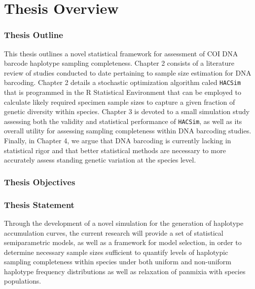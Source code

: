 \linespread{1.0}

\chapter{Thesis Overview}
\subsection{Thesis Outline} \label{sec:intro1}

This thesis outlines a novel statistical framework for assessment of COI DNA barcode haplotype sampling completeness. Chapter 2 consists of a literature review of studies conducted to date pertaining to sample size estimation for DNA barcoding. Chapter 2 details a stochastic optimization algorithm caled {\tt HACSim} that is programmed in the R Statistical Environment that can be employed to calculate likely required specimen sample sizes to capture a given fraction of genetic diversity within species. Chapter 3 is devoted to a small simulation study assessing both the validity and statistical performance of {\tt HACSim}, as well as its overall utility for assessing sampling completeness within DNA barcoding studies. Finally, in Chapter 4, we argue that DNA barcoding is currently lacking in \\ statistical rigor and that better statistical methods are necessary to more accurately assess standing genetic variation at the species level.


\subsection{Thesis Objectives}


\subsection{Thesis Statement}

Through the development of a novel simulation for the generation of haplotype \\ accumulation curves, the current research will provide a set of statistical semiparametric models, as well as a framework for model selection, in order to determine necessary sample sizes sufficient to quantify levels of haplotypic sampling completeness within species under both uniform and non-uniform haplotype frequency distributions as well as relaxation of panmixia with species populations.



  
